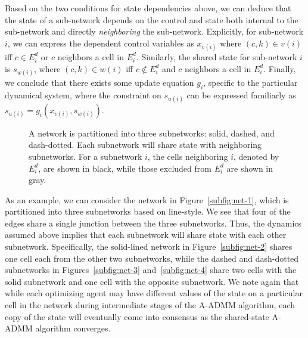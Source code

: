 Based on the two conditions for state dependencies above, we can deduce that the state of a sub-network depends on the control and state both internal to the sub-network and directly \emph{neighboring} the sub-network. Explicitly, for sub-network $i$, we can express the dependent control variables as $x_{v\left(i\right)}$ where $\left(c,k\right)\in v\left(i\right)$ iff $c \in E^d_i$ or $c$ neighbors a cell in $E^d_i$. Similarly, the shared state for sub-network $i$ is $s_{w\left(i\right)}$, where $\left(c,k\right)\in w\left(i\right)$ iff $c \notin E^d_i$ and $c$ neighbors a cell in $E^d_i$. Finally, we conclude that there exists some update equation $g_i$, specific to the particular dynamical system, where the constraint on $s_{u\left(i\right)}$ can be expressed familiarly as $s_{u\left(i\right)} = g_i\left(x_{v\left(i\right)}, s_{w\left(i\right)}\right)$.

\begin{figure}
   \hfill
  \hfill
   \hfill
  \label{fig:net-example}
  \caption[A network partitioned into three subnetworks depicting internal vs. external cells for each subnetwork.]{A network is partitioned into three subnetworks: solid, dashed, and dash-dotted. Each subnetwork will share state with neighboring subnetworks. For a subnetwork $i$, the cells neighboring $i$, denoted by $E^d_i$, are shown in black, while those excluded from $E^d_i$ are shown in gray.}
\end{figure}

As an example, we can consider the network in Figure~\ref{subfig:net-1}, which is partitioned into three subnetworks based on line-style. We see that four of the edges share a single junction between the three subnetworks. Thus, the dynamics assumed above implies that each subnetwork will share state with each other subnetwork. Specifically, the solid-lined network in Figure~\ref{subfig:net-2} shares one cell each from the other two subnetworks, while the dashed and dash-dotted subnetworks in Figures~\ref{subfig:net-3} and~\ref{subfig:net-4} share two cells with the solid subnetwork and one cell with the opposite subnetwork. We note again that while each optimizing agent may have different values of the state on a particular cell in the network during intermediate stages of the A-ADMM algorithm, each copy of the state will eventually come into consensus as the shared-state A-ADMM algorithm converges.

